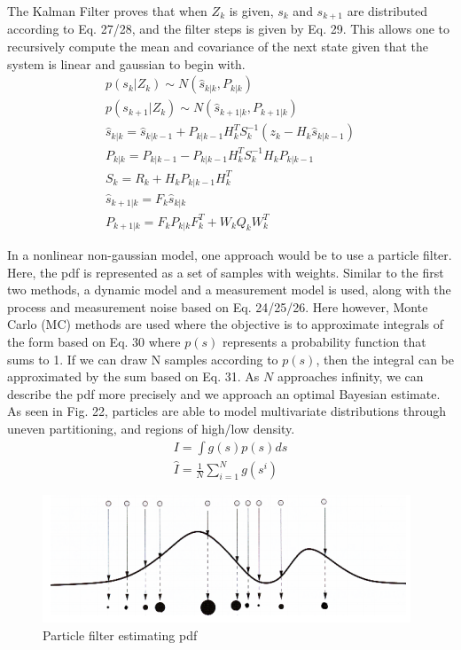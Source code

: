 \documentclass[a4paper]{IEEEtran}
\begin{document}
The Kalman Filter proves that when $Z_{k}$ is given, $s_{k}$ and $s_{k+1}$ are distributed according to Eq. 27/28, and the filter steps is given by Eq. 29. This allows one to recursively compute the mean and covariance of the next state given that the system is linear and gaussian to begin with.
\begingroup\makeatletter\def\f@size{7}\check@mathfonts
\begin{gather}
p(s_{k}|Z_{k})\sim N(\hat{s}_{k|k},P_{k|k}) \\
p(s_{k+1}|Z_{k})\sim N(\hat{s}_{k+1|k},P_{k+1|k}) \\
\hat{s}_{k|k}=\hat{s}_{k|k-1}+P_{k|k-1}H_{k}^{T}S_{k}^{-1}(z_{k}-H_{k}\hat{s}_{k|k-1}) \nonumber\\
P_{k|k}=P_{k|k-1}-P_{k|k-1}H_{k}^{T}S_{k}^{-1}H_{k}P_{k|k-1} \nonumber\\
S_{k}=R_{k}+H_{k}P_{k|k-1}H_{k}^{T} \nonumber\\
\hat{s}_{k+1|k}=F_{k}\hat{s}_{k|k} \nonumber\\
P_{k+1|k}=F_{k}P_{k|k}F_{k}^{T}+W_{k}Q_{k}W_{k}^{T}
\end{gather}
\endgroup

In a nonlinear non-gaussian model, one approach would be to use a particle filter. Here, the pdf is represented as a set of samples with weights. Similar to the first two methods, a dynamic model and a measurement model is used, along with the process and measurement noise based on Eq. 24/25/26. Here however, Monte Carlo (MC) methods are used where the objective is to approximate integrals of the form based on Eq. 30 where $p(s)$ represents a probability function that sums to 1. If we can draw N samples according to $p(s)$, then the integral can be approximated by the sum based on Eq. 31. As $N$ approaches infinity, we can describe the pdf more precisely and we approach an optimal Bayesian estimate. As seen in Fig. 22, particles are able to model multivariate distributions through uneven partitioning, and regions of high/low density.
\begingroup\makeatletter\def\f@size{7}\check@mathfonts
\begin{gather}
I=\int g(s)p(s)ds \\
\hat{I}=\frac{1}{N}\sum_{i=1}^{N}g(s^{i})
\end{gather}
\endgroup

\begin{figure}[h!]
  \centering
  \includegraphics[scale=0.3]{particles}
  \captionsetup{justification=centering}
  \caption{Particle filter estimating pdf}
\end{figure}
\end{document}
